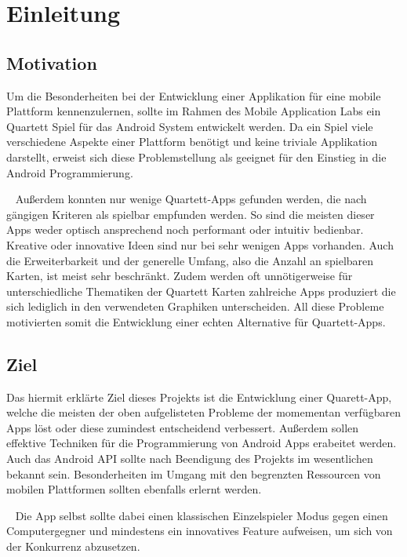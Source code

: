 \documentclass{scrartcl}
\begin{document}
\section{Einleitung}
\subsection{Motivation}

Um die Besonderheiten bei der Entwicklung einer Applikation für eine mobile
Plattform kennenzulernen, sollte im Rahmen des Mobile Application Labs ein
Quartett Spiel für das Android System entwickelt werden. Da ein Spiel viele
verschiedene Aspekte einer Plattform benötigt und keine triviale Applikation
darstellt, erweist sich diese Problemstellung als geeignet für den Einstieg in
die Android Programmierung.

\ \newline
Außerdem konnten nur wenige Quartett-Apps gefunden werden, die nach gängigen
Kriteren als spielbar empfunden werden. So sind die meisten dieser Apps weder
optisch ansprechend noch performant oder intuitiv bedienbar. Kreative oder
innovative Ideen sind nur bei sehr wenigen Apps vorhanden. Auch die
Erweiterbarkeit und der generelle Umfang, also die Anzahl an spielbaren Karten,
ist meist sehr beschränkt. Zudem werden oft unnötigerweise für unterschiedliche
Thematiken der Quartett Karten zahlreiche Apps produziert die sich lediglich
in den verwendeten Graphiken unterscheiden. All diese Probleme motivierten somit
die Entwicklung einer echten Alternative für Quartett-Apps.

\subsection{Ziel}

Das hiermit erklärte Ziel dieses Projekts ist die Entwicklung einer Quarett-App,
welche die meisten der oben aufgelisteten Probleme der momementan verfügbaren
Apps löst oder diese zumindest entscheidend verbessert. Außerdem sollen
effektive Techniken für die Programmierung von Android Apps erabeitet werden.
Auch das Android API sollte nach Beendigung des Projekts im wesentlichen bekannt
sein. Besonderheiten im Umgang mit den begrenzten Ressourcen von mobilen
Plattformen sollten ebenfalls erlernt werden.

\ \newline
Die App selbst sollte dabei einen klassischen Einzelspieler Modus gegen einen
Computergegner und mindestens ein innovatives Feature aufweisen, um sich von der
Konkurrenz abzusetzen.
\end{document}
